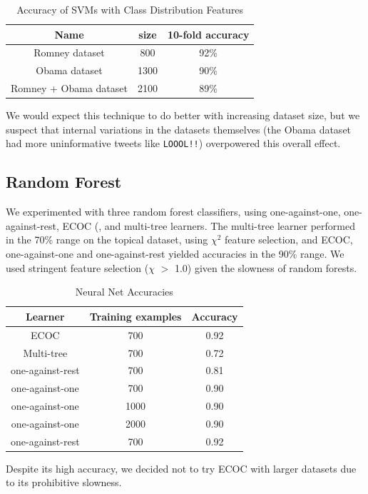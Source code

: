 \documentclass[fontsize=10pt,twocolumn,letterpaper,abstracton]{scrartcl}
\begin{document}
\begin{table}[H]
\centering
\begin{tabular}{ c c c }
Name & size & 10-fold accuracy \\
\hline
Romney dataset & 800 & 92\% \\
Obama dataset & 1300 &  90\% \\
Romney + Obama dataset & 2100 & 89\% \\
\end{tabular}
\caption{Accuracy of SVMs with Class Distribution Features}
\label{tb:svm-cdf-accuracy}
\end{table}

We would expect this technique to do better with increasing dataset size, but we suspect that internal variations in the datasets themselves (the Obama dataset had more uninformative tweets like \verb|LOOOL!!|) overpowered this overall effect.

\subsection{Random Forest}

We experimented with three random forest classifiers, using one-against-one, one-against-rest, ECOC (\cite{ECOC}, and multi-tree learners.  The multi-tree learner performed in the 70\% range on the topical dataset, using $\chi^{2}$ feature selection, and ECOC, one-against-one and one-against-rest yielded accuracies in the 90\% range.  We used stringent feature selection ($\chi$ $>$ 1.0) given the slowness of random forests.

\begin{table}[H]
\begin{tabular}{ c | c | c }
Learner & Training examples & Accuracy\\
\hline
ECOC & 700 & 0.92\\
Multi-tree & 700 & 0.72\\
one-against-rest & 700 & 0.81\\
one-against-one & 700 & 0.90\\
one-against-one & 1000 & 0.90\\
one-against-one & 2000 & 0.90\\
one-against-rest & 700 & 0.92\\
\end{tabular}
\caption{Neural Net Accuracies}
\label{tb:nb-inf}
\end{table}

Despite its high accuracy, we decided not to try ECOC with larger datasets due to its prohibitive slowness.
\end{document}
